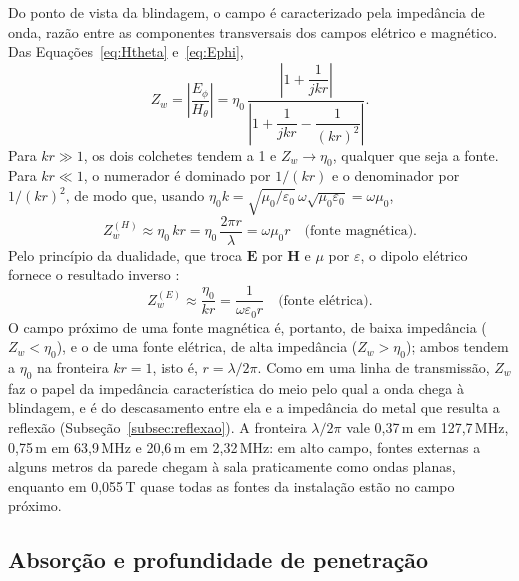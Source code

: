 \documentclass[portuguese]{sbcreviews-2025}%
\begin{document}
Do ponto de vista da blindagem, o campo é caracterizado pela impedância de onda, razão entre as componentes transversais dos campos elétrico e magnético. Das Equações~\eqref{eq:Htheta} e~\eqref{eq:Ephi},
\begin{equation}
Z_w = \left|\frac{E_\phi}{H_\theta}\right| = \eta_0\,\frac{\left|1 + \dfrac{1}{jkr}\right|}{\left|1 + \dfrac{1}{jkr} - \dfrac{1}{(kr)^2}\right|}.
\label{eq:zw_ratio}
\end{equation}
Para $kr \gg 1$, os dois colchetes tendem a 1 e $Z_w \to \eta_0$, qualquer que seja a fonte. Para $kr \ll 1$, o numerador é dominado por $1/(kr)$ e o denominador por $1/(kr)^2$, de modo que, usando $\eta_0 k = \sqrt{\mu_0/\varepsilon_0}\,\omega\sqrt{\mu_0\varepsilon_0} = \omega\mu_0$,
\begin{equation}
Z_w^{(H)} \approx \eta_0\,kr = \eta_0\,\frac{2\pi r}{\lambda} = \omega\mu_0 r \quad \mbox{(fonte magnética)}.
\label{eq:zw_h}
\end{equation}
Pelo princípio da dualidade, que troca $\mathbf{E}$ por $\mathbf{H}$ e $\mu$ por $\varepsilon$, o dipolo elétrico fornece o resultado inverso \citep{balanis2016, ott2009}:
\begin{equation}
Z_w^{(E)} \approx \frac{\eta_0}{kr} = \frac{1}{\omega\varepsilon_0 r} \quad \mbox{(fonte elétrica)}.
\label{eq:zw_e}
\end{equation}
O campo próximo de uma fonte magnética é, portanto, de baixa impedância ($Z_w < \eta_0$), e o de uma fonte elétrica, de alta impedância ($Z_w > \eta_0$); ambos tendem a $\eta_0$ na fronteira $kr = 1$, isto é, $r = \lambda/2\pi$. Como em uma linha de transmissão, $Z_w$ faz o papel da impedância característica do meio pelo qual a onda chega à blindagem, e é do descasamento entre ela e a impedância do metal que resulta a reflexão (Subseção~\ref{subsec:reflexao}). A fronteira $\lambda/2\pi$ vale 0,37\,m em 127,7\,MHz, 0,75\,m em 63,9\,MHz e 20,6\,m em 2,32\,MHz: em alto campo, fontes externas a alguns metros da parede chegam à sala praticamente como ondas planas, enquanto em 0,055\,T quase todas as fontes da instalação estão no campo próximo.

\subsection{Absorção e profundidade de penetração}
\label{subsec:absorcao}
\end{document}

